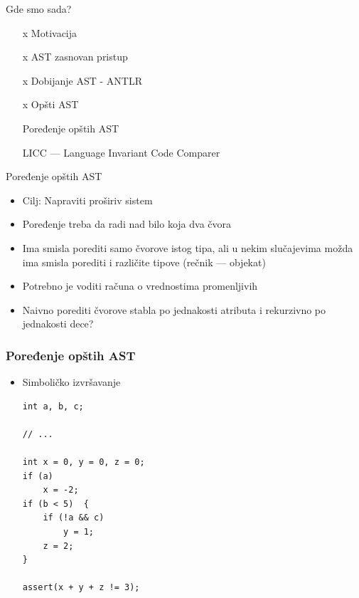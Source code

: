 \documentclass{beamer}
\begin{document}
\begin{frame}{Gde smo sada?}
    \begin{itemize}
        \item [x] Motivacija
        \item [x] AST zasnovan pristup
        \item [x] Dobijanje AST - ANTLR
        \item [x] Op\v{s}ti AST
        \item [ ] Poređenje op\v{s}tih AST
        \item [ ] LICC --- Language Invariant Code Comparer
    \end{itemize}
\end{frame}

\begin{frame}{Poređenje opštih AST}
    \begin{itemize}
        \item Cilj: Napraviti pro\v{s}iriv sistem
        \item Poređenje treba da radi nad bilo koja dva \v{c}vora
        \item Ima smisla porediti samo \v{c}vorove istog tipa, ali u nekim slu\v{c}ajevima mo\v{z}da ima smisla porediti i razli\v{c}ite tipove (re\v{c}nik --- objekat)
        \item Potrebno je voditi ra\v{c}una o vrednostima promenljivih
        \item Naivno porediti \v{c}vorove stabla po jednakosti atributa i rekurzivno po jednakosti dece?
    \end{itemize}
\end{frame}

\begin{frame}[fragile]
    \frametitle{Poređenje opštih AST}
    \begin{itemize}
        \item Simboli\v{c}ko izvr\v{s}avanje 
\begin{lstlisting}
int a, b, c;

// ...

int x = 0, y = 0, z = 0;
if (a)      
    x = -2;
if (b < 5)  {
    if (!a && c)    
        y = 1;
    z = 2;
}

assert(x + y + z != 3);
\end{lstlisting}
    \end{itemize}
\end{frame}
\end{document}
